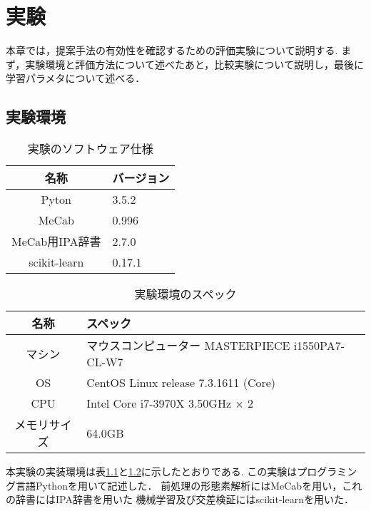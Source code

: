 \chapter{実験}
本章では，提案手法の有効性を確認するための評価実験について説明する.
まず，実験環境と評価方法について述べたあと，比較実験について説明し，最後に学習パラメタについて述べる．

\section{実験環境}
\begin{table}[ht]
  \begin{center}
  \caption{実験のソフトウェア仕様}
  \label{ex-software}
  \begin{tabular}{|c|l|}
    \hline
    名称 & バージョン \\ \hline \hline
    Pyton & 3.5.2 \\ \hline
    MeCab &  0.996 \\ \hline
    MeCab用IPA辞書 & 2.7.0 \\ \hline
    scikit-learn & 0.17.1 \\ \hline
  \end{tabular}
  \end{center}
\end{table}


\begin{table}[ht]
  \begin{center}
  \caption{実験環境のスペック}
  \label{ex-spec}
  \begin{tabular}{|c|l|}
    \hline
     名称 & スペック \\ \hline \hline
    マシン &  マウスコンピューター MASTERPIECE i1550PA7-CL-W7\\ \hline
    OS &  CentOS Linux release 7.3.1611 (Core)\\ \hline
    CPU & Intel Core i7-3970X 3.50GHz × 2 \\ \hline
    メモリサイズ & 64.0GB \\ \hline
  \end{tabular}
  \end{center}
\end{table}

本実験の実装環境は表\ref{ex-software}と\ref{ex-spec}に示したとおりである.
この実験はプログラミング言語Python\cite{python}を用いて記述した．
前処理の形態素解析にはMeCab\cite{mecab}を用い，これの辞書にはIPA辞書を用いた
機械学習及び交差検証にはscikit-learn\cite{sklearn}を用いた．

